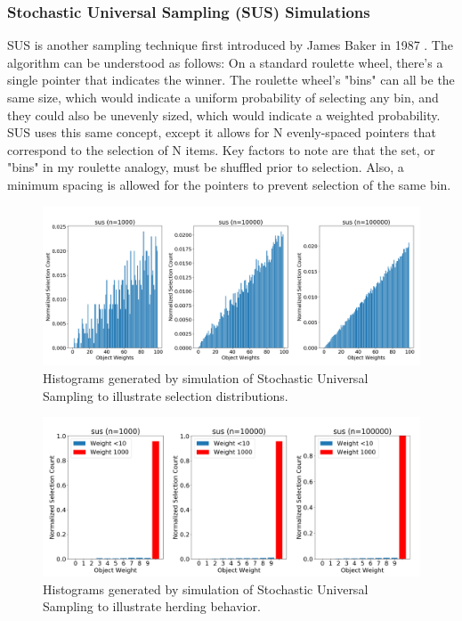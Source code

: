 \documentclass[12pt]{article}
\begin{document}
    \subsubsection{Stochastic Universal Sampling (SUS) Simulations}
    SUS is another sampling technique first introduced by James Baker in 1987
    \cite{baker1987}. The algorithm can be understood as follows: On a
    standard roulette wheel, there's a single pointer that indicates the winner.
    The roulette wheel's "bins" can all be the same size, which would indicate a
    uniform probability of selecting any bin, and they could also be unevenly
    sized, which would indicate a weighted probability. SUS uses this same
    concept, except it allows for N evenly-spaced pointers that correspond to the
    selection of N items. Key factors to note are that the set, or "bins" in my
    roulette analogy, must be shuffled prior to selection. Also, a minimum
    spacing is allowed for the pointers to prevent selection of the same bin.

    \begin{figure}[htbp]
      \centering
      \includegraphics[scale=0.32]{images/herding_roullette.png} 
      \caption{Histograms generated by simulation of Stochastic Universal
               Sampling to illustrate selection distributions.}
      \label{fig:herding_roullette}
    \end{figure}

    \begin{figure}[htbp]
      \centering
      \includegraphics[scale=0.32]{images/pathological_roullette.png} 
      \caption{Histograms generated by simulation of Stochastic Universal
               Sampling to illustrate herding behavior.}
      \label{fig:pathological_roullette}
    \end{figure}
\end{document}
